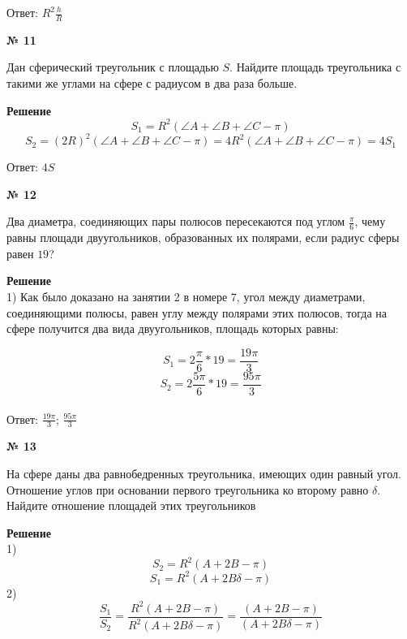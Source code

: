     Ответ: $R^2\frac{h}{R}$

    \begin{center}
        \textbf{№ 11}
    \end{center}

    Дан сферический треугольник с площадью $S$.
    Найдите площадь треугольника с такими же углами на сфере с радиусом в два раза больше.

    \textbf{Решение}\\

    \[
        S_1 = R^2(\angle A + \angle B + \angle C - \pi)
    \]
    \[
        S_2 = (2R)^2(\angle A + \angle B + \angle C - \pi) = 4R^2(\angle A + \angle B + \angle C - \pi) = 4S_1
    \]

    Ответ: $4S$

    \begin{center}
        \textbf{№ 12}
    \end{center}

    Два диаметра, соединяющих пары полюсов пересекаются под углом $\frac{\pi}{6}$,
    чему равны площади двуугольников, образованных их полярами, если радиус сферы равен $19$?

    \textbf{Решение}\\

    1) Как было доказано на занятии 2 в номере 7, угол между диаметрами, соединяющими полюсы,
    равен углу между полярами этих полюсов, тогда на сфере получится два вида двуугольников,
    площадь которых равны:

    \[
        S_1 = 2\frac{\pi}{6} * 19 = \frac{19\pi}{3}
    \]
    \[
        S_2 = 2\frac{5\pi}{6} * 19 = \frac{95\pi}{3}
    \]\\

    Ответ: $\frac{19\pi}{3}$; $\frac{95\pi}{3}$

    \begin{center}
        \textbf{№ 13}
    \end{center}

    На сфере даны два равнобедренных треугольника, имеющих один равный угол.
    Отношение углов при основании первого треугольника ко второму равно $\delta$.
    Найдите отношение площадей этих треугольников

    \textbf{Решение}\\

    1)
    \[
        S_2 = R ^ 2(A + 2B - \pi)
    \]
    \[
        S_1 = R^2(A + 2B\delta - \pi)
    \]
    2)
    \[
        \frac{S_1}{S_2} = \frac{R ^ 2(A + 2B - \pi)}{R ^ 2(A + 2B\delta - \pi)} = \frac{(A + 2B - \pi)}{(A + 2B\delta - \pi)}
    \]

